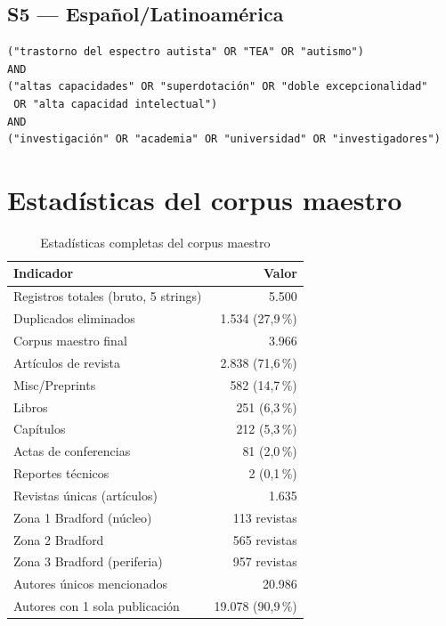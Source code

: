 \documentclass[12pt, a4paper]{article}
\begin{document}
\subsection*{S5 — Español/Latinoamérica}
\begin{verbatim}
("trastorno del espectro autista" OR "TEA" OR "autismo")
AND
("altas capacidades" OR "superdotación" OR "doble excepcionalidad"
 OR "alta capacidad intelectual")
AND
("investigación" OR "academia" OR "universidad" OR "investigadores")
\end{verbatim}

\section{Estadísticas del corpus maestro}
\label{app:stats}

\begin{table}[H]
\centering
\caption{Estadísticas completas del corpus maestro}
\label{tab:stats}
\small
\begin{tabular}{@{}lr@{}}
\toprule
\textbf{Indicador} & \textbf{Valor} \\
\midrule
Registros totales (bruto, 5 strings)    & 5.500 \\
Duplicados eliminados                    & 1.534 (27,9\,\%) \\
Corpus maestro final                     & 3.966 \\
\quad Artículos de revista              & 2.838 (71,6\,\%) \\
\quad Misc/Preprints                    & 582 (14,7\,\%) \\
\quad Libros                            & 251 (6,3\,\%) \\
\quad Capítulos                         & 212 (5,3\,\%) \\
\quad Actas de conferencias             & 81 (2,0\,\%) \\
\quad Reportes técnicos                 & 2 (0,1\,\%) \\
\midrule
Revistas únicas (artículos)             & 1.635 \\
Zona 1 Bradford (núcleo)                & 113 revistas \\
Zona 2 Bradford                         & 565 revistas \\
Zona 3 Bradford (periferia)             & 957 revistas \\
\midrule
Autores únicos mencionados              & 20.986 \\
Autores con 1 sola publicación          & 19.078 (90,9\,\%) \\

\end{tabular}
\end{table}
\end{document}
